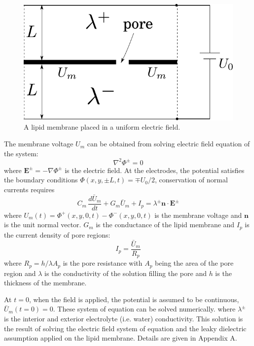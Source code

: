 \documentclass[english,12pt]{article}
\begin{document}
\begin{figure}[H]
	\centering
	\includegraphics[scale=0.75]{pics/model0.pdf}
	\caption{A lipid membrane placed in a uniform electric field.}
\end{figure}
The membrane voltage $U_m$ can be obtained from solving electric field equation of the system:
\begin{equation}
	\nabla^{2}\Phi^{\pm}=0
\end{equation}
where $\mathbf{E}^{\pm}=-\nabla\Phi^{\pm}$ is the electric field. At the electrodes, the potential satisfies the boundary conditions $\Phi(x,y,\pm L,t)=\mp U_0/2$, conservation of normal currents requires
\begin{equation}
	C_m\,\frac{d\bar{U}_m}{dt}+G_m\bar{U}_{m} +I_{p}=\lambda^{\pm}\mathbf{n}\cdot\mathbf{E}^{\pm}
\end{equation}
where $U_m(t)=\Phi^{+}(x,y,0,t)-\Phi^{-}(x,y,0,t)$ is the membrane voltage and $\mathbf{n}$ is the unit normal vector. $G_m$ is the conductance of the lipid membrane and $I_p$ is the current density of pore regions:
\begin{equation}
I_p=\frac{\bar{U}_m}{R_{p}}
\label{Um}
\end{equation}
where $R_p=h/\lambda A_p$ is the pore resistance with $A_p$ being the area of the pore region and $\lambda$ is the conductivity of the solution filling the pore and $h$ is the thickness of the membrane.

At $t=0$, when the field is applied, the potential is assumed to be continuous, $\bar{U}_m(t=0)=0$. These system of equation can be solved numerically.
where $\lambda^{\pm}$ is the interior and exterior electrolyte (i.e. water) conductivity. This solution is the result of solving the electric field system of equation and the leaky dielectric assumption applied on the lipid membrane. Details are given in Appendix A.
\end{document}

